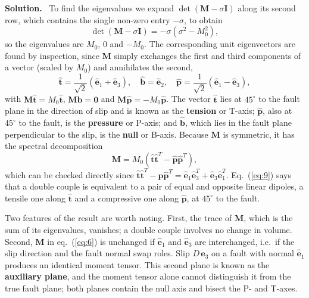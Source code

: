 \documentclass[a4paper,12pt]{paper}
\newenvironment{solution}{\par\noindent\textbf{Solution.}\ }{\par\medskip}
\begin{document}
\begin{solution}
To find the eigenvalues we expand $\det(\mathbf{M}-\sigma\mathbf{I})$ along its second
row, which contains the single non-zero entry $-\sigma$, to obtain
\begin{equation}
\det(\mathbf{M}-\sigma\mathbf{I})=-\sigma\left(\sigma^{2}-M_{0}^{2}\right),
\label{eq:7}
\end{equation}
so the eigenvalues are $M_{0}$, $0$ and $-M_{0}$. The corresponding unit eigenvectors are
found by inspection, since $\mathbf{M}$ simply exchanges the first and third components of
a vector (scaled by $M_{0}$) and annihilates the second,
\begin{equation}
\hat{\mathbf{t}}=\frac{1}{\sqrt{2}}\left(\hat{\mathbf{e}}_{1}+\hat{\mathbf{e}}_{3}\right),\quad
\hat{\mathbf{b}}=\hat{\mathbf{e}}_{2},\quad
\hat{\mathbf{p}}=\frac{1}{\sqrt{2}}\left(\hat{\mathbf{e}}_{1}-\hat{\mathbf{e}}_{3}\right),
\label{eq:8}
\end{equation}
with $\mathbf{M}\hat{\mathbf{t}}=M_{0}\hat{\mathbf{t}}$, $\mathbf{M}\hat{\mathbf{b}}=\mathbf{0}$
and $\mathbf{M}\hat{\mathbf{p}}=-M_{0}\hat{\mathbf{p}}$. The vector $\hat{\mathbf{t}}$ lies at
$45^{\circ}$ to the fault plane in the direction of slip and is known as the
\textbf{tension} or T-axis; $\hat{\mathbf{p}}$, also at $45^{\circ}$ to the fault, is the
\textbf{pressure} or P-axis; and $\hat{\mathbf{b}}$, which lies in the fault plane
perpendicular to the slip, is the \textbf{null} or B-axis. Because $\mathbf{M}$ is
symmetric, it has the spectral decomposition
\begin{equation}
\mathbf{M}=M_{0}\left(\hat{\mathbf{t}}\hat{\mathbf{t}}^{T}-\hat{\mathbf{p}}\hat{\mathbf{p}}^{T}\right),
\label{eq:9}
\end{equation}
which can be checked directly since
$\hat{\mathbf{t}}\hat{\mathbf{t}}^{T}-\hat{\mathbf{p}}\hat{\mathbf{p}}^{T}
=\hat{\mathbf{e}}_{1}\hat{\mathbf{e}}_{3}^{T}+\hat{\mathbf{e}}_{3}\hat{\mathbf{e}}_{1}^{T}$.
Eq.~(\ref{eq:9}) says that a double couple is equivalent to a pair of equal and opposite
linear dipoles, a tensile one along $\hat{\mathbf{t}}$ and a compressive one along
$\hat{\mathbf{p}}$, at $45^{\circ}$ to the fault.

Two features of the result are worth noting. First, the trace of $\mathbf{M}$, which is
the sum of its eigenvalues, vanishes; a double couple involves no change in volume.
Second, $\mathbf{M}$ in eq.~(\ref{eq:6}) is unchanged if $\hat{\mathbf{e}}_{1}$ and
$\hat{\mathbf{e}}_{3}$ are interchanged, i.e.\ if the slip direction and the fault normal
swap roles. Slip $D\,\hat{\mathbf{e}}_{3}$ on a fault with normal $\hat{\mathbf{e}}_{1}$
produces an identical moment tensor. This second plane is known as the
\textbf{auxiliary plane}, and the moment tensor alone cannot distinguish it from the
true fault plane; both planes contain the null axis and bisect the P- and T-axes.
\end{solution}
\end{document}
